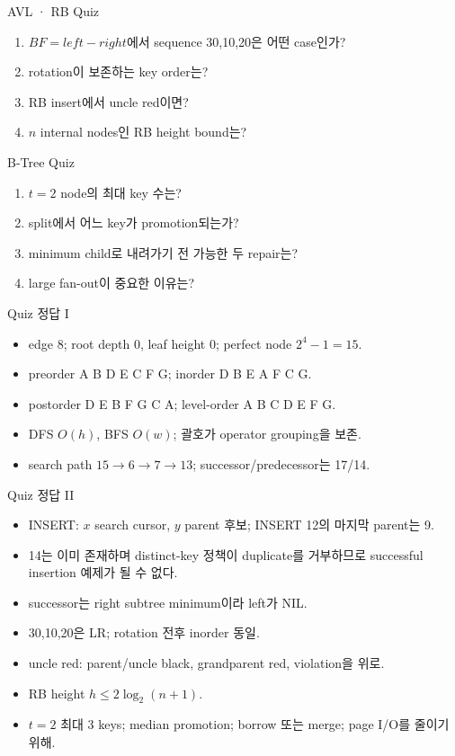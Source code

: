 \begin{frame}{AVL · RB Quiz}
\begin{enumerate}\item $BF=left-right$에서 sequence 30,10,20은 어떤 case인가?\item rotation이 보존하는 key order는?\item RB insert에서 uncle red이면?\item $n$ internal nodes인 RB height bound는?\end{enumerate}
\end{frame}
\begin{frame}{B-Tree Quiz}
\begin{enumerate}\item $t=2$ node의 최대 key 수는?\item split에서 어느 key가 promotion되는가?\item minimum child로 내려가기 전 가능한 두 repair는?\item large fan-out이 중요한 이유는?\end{enumerate}
\end{frame}
\begin{frame}{Quiz 정답 I}
\small\begin{itemize}
\item edge 8; root depth 0, leaf height 0; perfect node $2^{4}-1=15$.
\item preorder A B D E C F G; inorder D B E A F C G.
\item postorder D E B F G C A; level-order A B C D E F G.
\item DFS $O(h)$, BFS $O(w)$; 괄호가 operator grouping을 보존.
\item search path $15\to6\to7\to13$; successor/predecessor는 17/14.
\end{itemize}
\end{frame}
\begin{frame}{Quiz 정답 II}
\small\begin{itemize}
\item INSERT: $x$ search cursor, $y$ parent 후보; INSERT 12의 마지막 parent는 9.
\item 14는 이미 존재하며 distinct-key 정책이 duplicate를 거부하므로 successful insertion 예제가 될 수 없다.
\item successor는 right subtree minimum이라 left가 NIL.
\item 30,10,20은 LR; rotation 전후 inorder 동일.
\item uncle red: parent/uncle black, grandparent red, violation을 위로.
\item RB height $h\le2\log_2(n+1)$.
\item $t=2$ 최대 3 keys; median promotion; borrow 또는 merge; page I/O를 줄이기 위해.
\end{itemize}
\end{frame}
